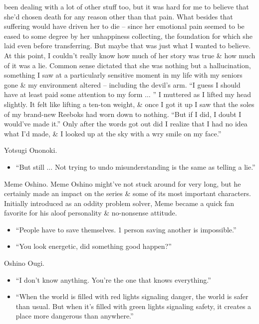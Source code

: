 \documentclass{article}
\begin{document}
\begin{enumerate}
\begin{itemize}
been dealing with a lot of other stuff too, but it was hard for me to believe that she'd chosen death for any reason other than that pain. What besides that suffering would have driven her to die -- since her emotional pain seemed to be eased to some degree by her unhappiness collecting, the foundation for which she laid even before transferring. But maybe that was just what I wanted to believe. At this point, I couldn't really know how much of her story was true \& how much of it was a lie. Common sense dictated that she was nothing but a hallucination, something I saw at a particularly sensitive moment in my life with my seniors gone \& my environment altered -- including the devil's arm. ``I guess I should have at least paid some attention to my form $\ldots$ '' I muttered as I lifted my head slightly. It felt like lifting a ten-ton weight, \& once I got it up I saw that the soles of my brand-new Reeboks had worn down to nothing. ``But if I did, I doubt I would've made it.'' Only after the words got out did I realize that I had no idea what I'd made, \& I looked up at the sky with a wry smile on my face.''
    \end{itemize}
    {\sf Yotsugi Ononoki.}
    \begin{itemize}
    	\item ``But still $\ldots$ Not trying to undo misunderstanding is the same as telling a lie.''
    \end{itemize}
    {\sf Meme Oshino.} Meme Oshino might've not stuck around for very long, but he certainly made an impact on the series \& some of its most important characters. Initially introduced as an oddity problem solver, Meme became a quick fan favorite for his aloof personality \& no-nonsense attitude.
    \begin{itemize}
    	\item ``People have to save themselves. 1 person saving another is impossible.''
    	\item ``You look energetic, did something good happen?''
    \end{itemize}
    {\sf Oshino Ougi.}
    \begin{itemize}
    	\item ``I don't know anything. You're the one that knows everything.''
    	\item ``When the world is filled with red lights signaling danger, the world is safer than usual. But when it's filled with green lights signaling safety, it creates a place more dangerous than anywhere.''
    \end{itemize}

\end{enumerate}
\end{document}
